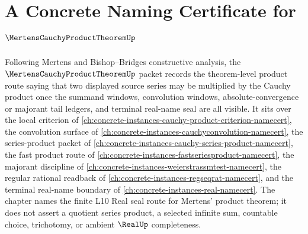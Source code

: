 \chapter{A Concrete Naming Certificate for $\MertensCauchyProductTheoremUp$}
\label{ch:concrete-instances-mertens-cauchy-product-theorem-namecert}

Following Mertens and Bishop--Bridges constructive analysis, the $\MertensCauchyProductTheoremUp$ packet records the theorem-level product route saying that two displayed source series may be multiplied by the Cauchy product once the summand windows, convolution windows, absolute-convergence or majorant tail ledgers, and terminal real-name seal are all visible. It sits over the local criterion of \autoref{ch:concrete-instances-cauchy-product-criterion-namecert}, the convolution surface of \autoref{ch:concrete-instances-cauchyconvolution-namecert}, the series-product packet of \autoref{ch:concrete-instances-cauchy-series-product-namecert}, the fast product route of \autoref{ch:concrete-instances-fastseriesproduct-namecert}, the majorant discipline of \autoref{ch:concrete-instances-weierstrassmtest-namecert}, the regular rational readback of \autoref{ch:concrete-instances-regseqrat-namecert}, and the terminal real-name boundary of \autoref{ch:concrete-instances-real-namecert}. The chapter names the finite L10 Real seal route for Mertens' product theorem; it does not assert a quotient series product, a selected infinite sum, countable choice, trichotomy, or ambient $\RealUp$ completeness.

